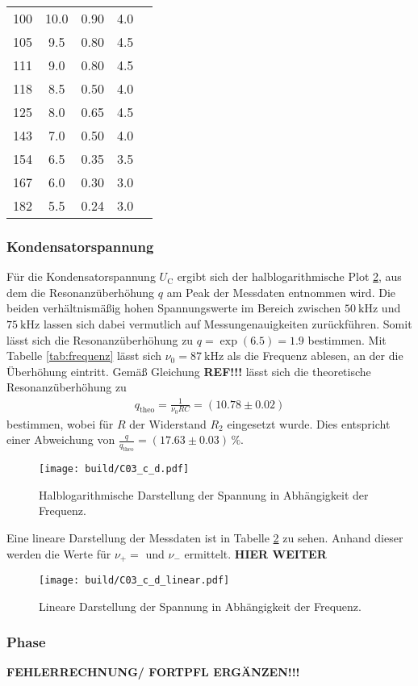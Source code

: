 \begin{table}[H]
\begin{tabular}{S[table-format = 3.0] S[table-format= 2.1] S[table-format = 1.2] S[table-format = 1.1] S[table-format = 2.2]}
        100 & 10.0 & 0.90 & 4.0 &  \\
        105 &  9.5 & 0.80 & 4.5 &  \\
        111 &  9.0 & 0.80 & 4.5 &  \\
        118 &  8.5 & 0.50 & 4.0 &  \\
        125 &  8.0 & 0.65 & 4.5 &  \\
        143 &  7.0 & 0.50 & 4.0 &  \\
        154 &  6.5 & 0.35 & 3.5 &  \\
        167 &  6.0 & 0.30 & 3.0 &  \\
        182 &  5.5 & 0.24 & 3.0 &  \\
        \bottomrule
    \end{tabular}
\end{table}
\noindent

\subsubsection{Kondensatorspannung}
Für die Kondensatorspannung $U_\text{C}$ ergibt sich der halblogarithmische Plot \ref{fig:plot_spannung}, aus dem die 
Resonanzüberhöhung $q$ am Peak der Messdaten entnommen wird.
Die beiden verhältnismäßig hohen Spannungswerte im Bereich zwischen $\qty{50}{\kilo\hertz}$ und $\qty{75}{\kilo\hertz}$
lassen sich dabei vermutlich auf Messungenauigkeiten zurückführen.
Somit lässt sich die Resonanzüberhöhung zu $q = \exp(6.5) = 1.9$ bestimmen. 
Mit Tabelle \ref{tab:frequenz} lässt sich $\nu_0 = \qty{87}{\kilo\hertz}$ als die Frequenz ablesen, an der die Überhöhung eintritt.
Gemäß Gleichung \textbf{REF!!!} lässt sich die theoretische Resonanzüberhöhung zu 
\begin{align}
    q_\text{theo} = \frac{1}{\nu_0 R C} = (\num{10.78} \pm \num{0.02})
\end{align}
bestimmen, wobei für $R$ der Widerstand $R_2$ eingesetzt wurde.
Dies entspricht einer Abweichung von $\frac{q}{q_\text{theo}} = (\num{17.63} \pm \num{0.03}) \, \%$.
\begin{figure}[H]
    \centering
    \texttt{[image: build/C03\_c\_d.pdf]}
    \caption{Halblogarithmische Darstellung der Spannung in Abhängigkeit der Frequenz.}
    \label{fig:plot_spannung}
\end{figure}

\noindent
Eine lineare Darstellung der Messdaten ist in Tabelle \ref{fig:plot_spannung} zu sehen.
Anhand dieser werden die Werte für $\nu_+ = $ und $\nu_-$ ermittelt.
\textbf{HIER WEITER}
%
\begin{figure}[H]
    \centering
    \texttt{[image: build/C03\_c\_d\_linear.pdf]}
    \caption{Lineare Darstellung der Spannung in Abhängigkeit der Frequenz.}
    \label{fig:plot_spannung}
\end{figure}


\subsubsection{Phase}
\textbf{FEHLERRECHNUNG/ FORTPFL ERGÄNZEN!!!}